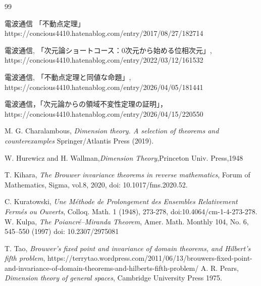 \documentclass[leqno, a4paper, 12pt]{jsarticle}
\begin{document}
\begin{thebibliography}{99}

電波通信
「不動点定理」
https://concious4410.hatenablog.com/entry/2017/08/27/182714




電波通信, 「次元論ショートコース：0次元から始める位相次元」, 
https://concious4410.hatenablog.com/entry/2022/03/12/161532


電波通信, 「不動点定理と同値な命題」, 
https://concious4410.hatenablog.com/entry/2026/04/05/181441

電波通信，「次元論からの領域不変性定理の証明」，
https://concious4410.hatenablog.com/entry/2026/04/15/220550

M. G. Charalambous, 
\textit{Dimension theory. A selection of theorems and counterexamples} Springer/Atlantis Press (2019). 

W. Hurewicz and H. Wallman,\textit{Dimension Theory},Princeton Univ. Press,1948


T. Kihara, 
\textit{The Brouwer invariance theorems in reverse mathematics},
Forum of Mathematics, Sigma,
vol.8,  2020, 
 doi: 10.1017/fms.2020.52. 
 
 C. Kuratowski, 
 \textit{Une M\'{e}thode de Prolongement des Ensembles Relativement Ferm\'{e}s ou Ouverts}, Colloq. Math. 1 (1948), 273-278, 
doi:10.4064/cm-1-4-273-278. 
W. Kulpa, 
\textit{The Poiancr\'{e}--Miranda Theorem}, 
Amer. Math. Monthly 104, No. 6, 545--550 (1997)
doi: 10.2307/2975081

T. Tao, 
\textit{Brouwer’s fixed point and invariance of domain theorems, and Hilbert’s fifth problem}, 
https://terrytao.wordpress.com/2011/06/13/brouwers-fixed-point-and-invariance-of-domain-theorems-and-hilberts-fifth-problem/
 A. R. 
 Pears,
 \textit{Dimension theory of general spaces}, 
 {Cambridge} {University} {Press}
1975. 

\end{thebibliography}




			
\end{document}
